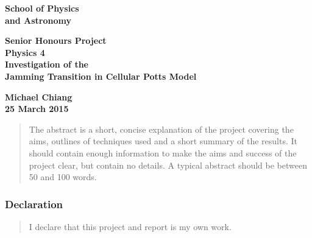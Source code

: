 \documentclass[a4paper,12pt]{article}
\begin{document}
\pagestyle{empty}                       %
\epsfxsize=40mm                         %
\begin{minipage}[b]{110mm}
        {\Huge\bf School of Physics\\ and Astronomy
        \vspace*{17mm}}
\end{minipage}
\hfill
\begin{minipage}[t]{40mm}               
\end{minipage}
\par\noindent                                           %
\vspace*{2cm}
\begin{center}
        \Large\bf \Large\bf Senior Honours Project\\
        \Large\bf Physics 4\\[10pt]                     %
        \LARGE\bf Investigation of the \\Jamming Transition in Cellular Potts Model       %
\end{center}
\vspace*{0.5cm}
\begin{center}
        \bf Michael Chiang\\                           %
        25 March 2015                                    %
\end{center}
\vspace*{5mm}
%
%                       
\begin{abstract}
        The abstract is a short, concise explanation of the project
        covering the aims, outlines of techniques used and a short
        summary of the results. It should contain enough information to
        make the aims and success of the project clear, but contain no details.
        A typical abstract should be between 50 and 100 words.
\end{abstract}

\vspace*{1cm}

\subsubsection*{Declaration}

\begin{quotation}
        I declare that this project and report is my own work.
\end{quotation}
\end{document}

